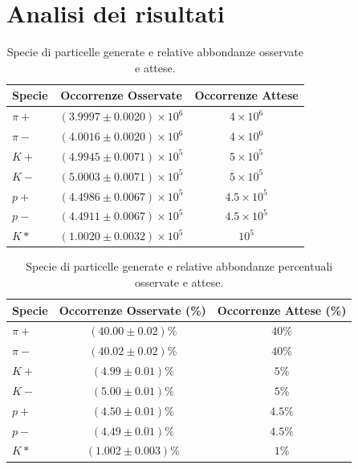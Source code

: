 \documentclass{article}
\begin{document}
\section{Analisi dei risultati}
\label{Analisi dei risultati}
\begin{table}[ht]
\centering
\begin{tabular}{|l|c|c|}
\hline 
Specie & Occorrenze Osservate & Occorrenze Attese \\
\hline
\(\pi+\) & \((3.9997 \pm 0.0020)\times10^6\) & \(4\times10^6\) \\
\(\pi-\) & \((4.0016 \pm 0.0020)\times10^6\) & \(4\times10^6\) \\
 \(K+\) & \((4.9945 \pm 0.0071)\times10^5\) & \(5\times10^5\) \\
\(K-\) & \((5.0003 \pm 0.0071)\times10^5\) & \(5\times10^5\) \\ 
 \(p+\) & \((4.4986 \pm 0.0067)\times10^5\) & \(4.5\times10^5\) \\ 
 \(p-\) & \((4.4911 \pm 0.0067)\times10^5\) & \(4.5\times10^5\) \\ 
 \(K*\) & \((1.0020 \pm 0.0032)\times10^5\) & \(10^5\) \\
 \hline
\end{tabular}
\caption{Specie di particelle generate e relative abbondanze osservate e attese.}
\label{Tabella1}
\end{table}
\begin{table}[ht]
\centering
\begin{tabular}{|l|c|c|}
\hline 
Specie & Occorrenze Osservate (\%) & Occorrenze Attese (\%)\\
\hline
\(\pi+\) & \((40.00 \pm 0.02)\%\) & \(40\%\) \\
\(\pi-\) & \((40.02 \pm 0.02)\%\) &  \(40\%\) \\
 \(K+\) & \((4.99 \pm 0.01)\%\) &  \(5\%\) \\
\(K-\) & \((5.00 \pm 0.01)\%\) & \(5\%\) \\ 
 \(p+\) & \((4.50 \pm 0.01)\%\) & \(4.5\%\) \\ 
 \(p-\) & \((4.49 \pm 0.01)\%\) & \(4.5\%\) \\ 
 \(K*\) & \((1.002 \pm 0.003)\%\) & \(1\%\) \\
 \hline
\end{tabular}
\caption{Specie di particelle generate e relative abbondanze percentuali osservate e attese.}
\label{Tabella1.2}
\end{table}
\end{document}
